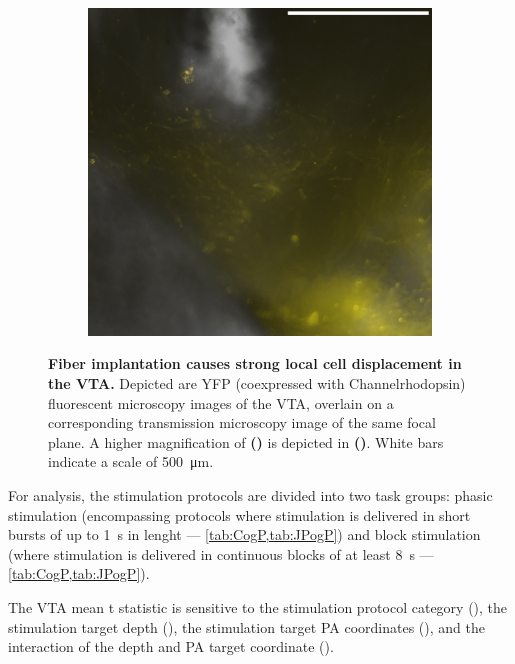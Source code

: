 \begin{figure}[h!]
	\begin{subfigure}{.2728\textwidth}
		\centering
		\includegraphics[width=\textwidth]{img/sub-6589_slice-a4_zoom-10_scene-2_transmission-yfp-comb_straight.png}
                \caption{}
		\label{fig:h6589z}
	\end{subfigure}
        \vspace{-.5em}
	\caption{
		\textbf{Fiber implantation causes strong local cell displacement in the VTA.}
                Depicted are YFP (coexpressed with Channelrhodopsin) fluorescent microscopy images of the VTA, overlain on a corresponding transmission microscopy image of the same focal plane.
                A higher magnification of \textbf{()} is depicted in \textbf{()}.
                White bars indicate a scale of \SI{500}{\micro\meter}.
                }
	\label{fig:h}
\end{figure}

For analysis, the stimulation protocols are divided into two task groups: phasic stimulation (encompassing protocols where stimulation is delivered in short bursts of up to \SI{1}{\second} in lenght --- \cref{tab:CogP,tab:JPogP}) and block stimulation (where stimulation is delivered in continuous blocks of at least \SI{8}{\second} --- \cref{tab:CogP,tab:JPogP}).

The VTA mean t statistic is sensitive to
the stimulation protocol category (),
the stimulation target depth (),
the stimulation target PA coordinates (),
and the interaction of the depth and PA target coordinate ().

